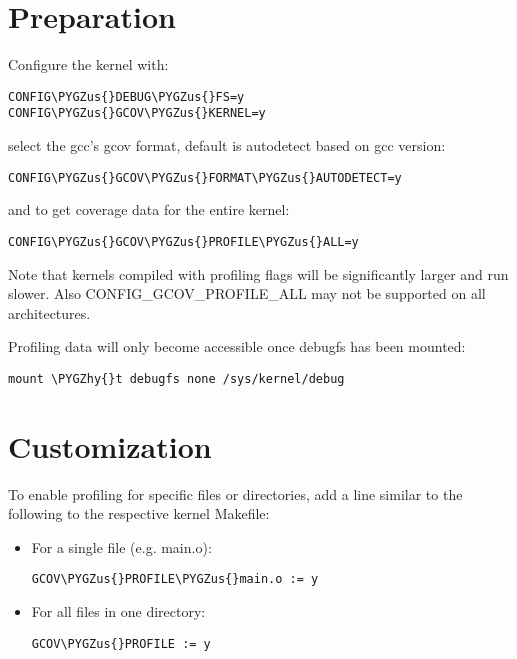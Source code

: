 \documentclass[a4paper,8pt,english]{sphinxmanual}
\def\PYGZus{\char`\_}
\def\PYGZhy{\char`\-}
\begin{document}
\section{Preparation}
\label{dev-tools/gcov:preparation}\label{dev-tools/gcov:lcov}
Configure the kernel with:

\begin{Verbatim}[commandchars=\\\{\}]
CONFIG\PYGZus{}DEBUG\PYGZus{}FS=y
CONFIG\PYGZus{}GCOV\PYGZus{}KERNEL=y
\end{Verbatim}

select the gcc's gcov format, default is autodetect based on gcc version:

\begin{Verbatim}[commandchars=\\\{\}]
CONFIG\PYGZus{}GCOV\PYGZus{}FORMAT\PYGZus{}AUTODETECT=y
\end{Verbatim}

and to get coverage data for the entire kernel:

\begin{Verbatim}[commandchars=\\\{\}]
CONFIG\PYGZus{}GCOV\PYGZus{}PROFILE\PYGZus{}ALL=y
\end{Verbatim}

Note that kernels compiled with profiling flags will be significantly
larger and run slower. Also CONFIG\_GCOV\_PROFILE\_ALL may not be supported
on all architectures.

Profiling data will only become accessible once debugfs has been
mounted:

\begin{Verbatim}[commandchars=\\\{\}]
mount \PYGZhy{}t debugfs none /sys/kernel/debug
\end{Verbatim}


\section{Customization}
\label{dev-tools/gcov:customization}
To enable profiling for specific files or directories, add a line
similar to the following to the respective kernel Makefile:
\begin{itemize}
\item {} 
For a single file (e.g. main.o):

\begin{Verbatim}[commandchars=\\\{\}]
GCOV\PYGZus{}PROFILE\PYGZus{}main.o := y
\end{Verbatim}

\item {} 
For all files in one directory:

\begin{Verbatim}[commandchars=\\\{\}]
GCOV\PYGZus{}PROFILE := y
\end{Verbatim}

\end{itemize}
\end{document}
